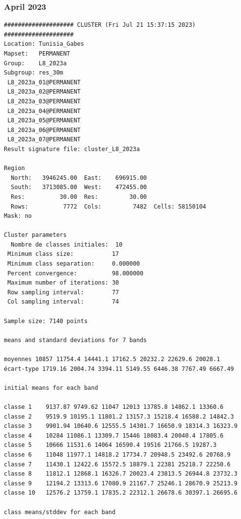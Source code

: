 \documentclass[environments,article,submit,pdftex,moreauthors]{Definitions/mdpi}
\begin{document}
\subsubsection[\appendixname~\thesubsubsection]{April 2023}
\begin{scriptsize}
\begin{verbatim}
#################### CLUSTER (Fri Jul 21 15:37:15 2023) ####################
Location: Tunisia_Gabes
Mapset:   PERMANENT
Group:    L8_2023a
Subgroup: res_30m
 L8_2023a_01@PERMANENT
 L8_2023a_02@PERMANENT
 L8_2023a_03@PERMANENT
 L8_2023a_04@PERMANENT
 L8_2023a_05@PERMANENT
 L8_2023a_06@PERMANENT
 L8_2023a_07@PERMANENT
Result signature file: cluster_L8_2023a

Region
  North:   3946245.00  East:    696915.00
  South:   3713085.00  West:    472455.00
  Res:          30.00  Res:         30.00
  Rows:          7772  Cols:         7482  Cells: 58150104
Mask: no

Cluster parameters
  Nombre de classes initiales: 	10
 Minimum class size:           17
 Minimum class separation:     0.000000
 Percent convergence:          98.000000
 Maximum number of iterations: 30
 Row sampling interval:        77
 Col sampling interval:        74

Sample size: 7140 points

means and standard deviations for 7 bands

moyennes 10857 11754.4 14441.1 17162.5 20232.2 22629.6 20028.1
écart-type 1719.16 2004.74 3394.11 5149.55 6446.38 7767.49 6667.49

initial means for each band

classe 1    9137.87 9749.62 11047 12013 13785.8 14862.1 13360.6
classe 2    9519.9 10195.1 11801.2 13157.3 15218.4 16588.2 14842.3
classe 3    9901.94 10640.6 12555.5 14301.7 16650.9 18314.3 16323.9
classe 4    10284 11086.1 13309.7 15446 18083.4 20040.4 17805.6
classe 5    10666 11531.6 14064 16590.4 19516 21766.5 19287.3
classe 6    11048 11977.1 14818.2 17734.7 20948.5 23492.6 20768.9
classe 7    11430.1 12422.6 15572.5 18879.1 22381 25218.7 22250.6
classe 8    11812.1 12868.1 16326.7 20023.4 23813.5 26944.8 23732.3
classe 9    12194.2 13313.6 17080.9 21167.7 25246.1 28670.9 25213.9
classe 10   12576.2 13759.1 17835.2 22312.1 26678.6 30397.1 26695.6

class means/stddev for each band


\end{verbatim}
\end{scriptsize}
\end{document}
